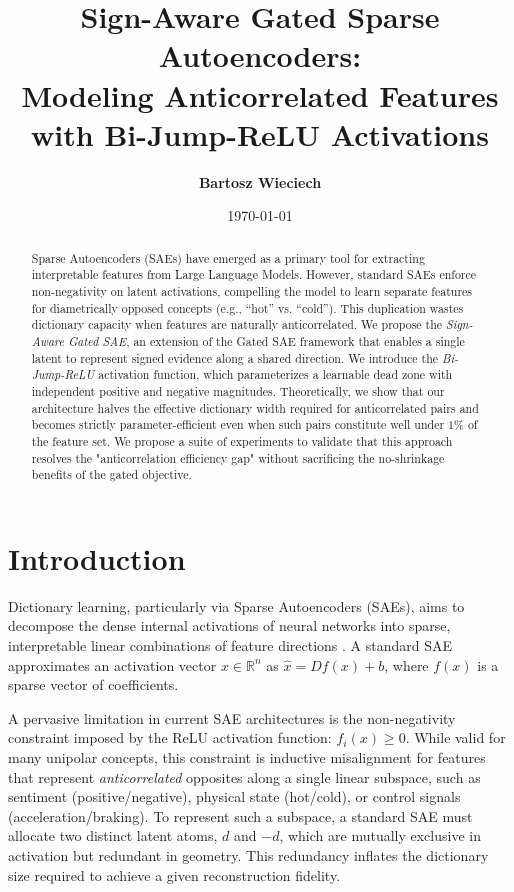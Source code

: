 \documentclass{article}
\title{\textbf{Sign-Aware Gated Sparse Autoencoders: \\ Modeling Anticorrelated Features with Bi-Jump-ReLU Activations}}
\author{
    \textbf{Bartosz Wieciech}
}
\date{\today}
\newcommand{\R}{\mathbb{R}}
\begin{document}
\maketitle

\begin{abstract}
Sparse Autoencoders (SAEs) have emerged as a primary tool for extracting interpretable features from Large Language Models. However, standard SAEs enforce non-negativity on latent activations, compelling the model to learn separate features for diametrically opposed concepts (e.g., ``hot'' vs. ``cold''). This duplication wastes dictionary capacity when features are naturally anticorrelated. We propose the \textit{Sign-Aware Gated SAE}, an extension of the Gated SAE framework that enables a single latent to represent signed evidence along a shared direction. We introduce the \textit{Bi-Jump-ReLU} activation function, which parameterizes a learnable dead zone with independent positive and negative magnitudes. Theoretically, we show that our architecture halves the effective dictionary width required for anticorrelated pairs and becomes strictly parameter-efficient even when such pairs constitute well under $1\%$ of the feature set. We propose a suite of experiments to validate that this approach resolves the "anticorrelation efficiency gap" without sacrificing the no-shrinkage benefits of the gated objective.
\end{abstract}


\section{Introduction}

Dictionary learning, particularly via Sparse Autoencoders (SAEs), aims to decompose the dense internal activations of neural networks into sparse, interpretable linear combinations of feature directions \cite{cunningham2023sparse, bricken2023towards}. A standard SAE approximates an activation vector $x \in \R^n$ as $\hat{x} = D f(x) + b$, where $f(x)$ is a sparse vector of coefficients.

A pervasive limitation in current SAE architectures is the non-negativity constraint imposed by the ReLU activation function: $f_i(x) \ge 0$. While valid for many unipolar concepts, this constraint is inductive misalignment for features that represent \textit{anticorrelated} opposites along a single linear subspace, such as sentiment (positive/negative), physical state (hot/cold), or control signals (acceleration/braking). To represent such a subspace, a standard SAE must allocate two distinct latent atoms, $d$ and $-d$, which are mutually exclusive in activation but redundant in geometry. This redundancy inflates the dictionary size required to achieve a given reconstruction fidelity.
\end{document}
